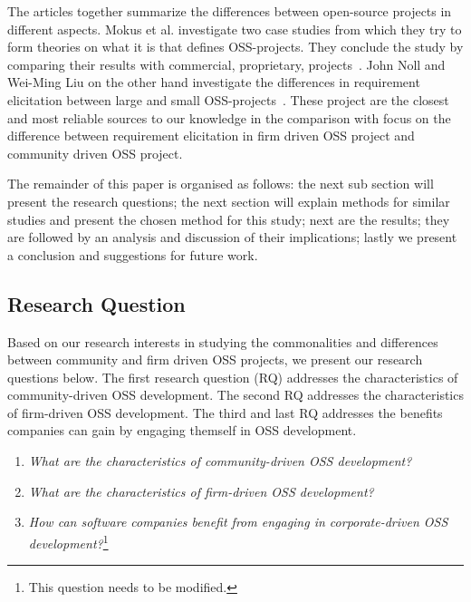 \documentclass[a4paper,11pt]{article}
\begin{document}
{%
The articles together summarize the differences between open-source projects in different aspects. Mokus et al. investigate two case studies from which they try to form theories on what it is that defines OSS-projects. They conclude the study by comparing their results with commercial, proprietary, projects~\cite{Mockus2002a}. John Noll and Wei-Ming Liu on the other hand investigate the differences in requirement elicitation between large and small OSS-projects~\cite{Noll}. These project are the closest and most reliable sources to our knowledge in the comparison with focus on the difference between requirement elicitation in firm driven OSS project and community driven OSS project.

The remainder of this paper is organised as follows: the next sub section will present the research questions; the next section will explain methods for similar studies and present the chosen method for this study; next are the results; they are followed by an analysis and discussion of their implications; lastly we present a conclusion and suggestions for future work.

\subsection{Research Question}
\label{sec:rq}
Based on our research interests in studying the commonalities and differences between community and firm driven OSS projects, we present our research questions below. The first research question (RQ) addresses the characteristics of community-driven OSS development. The second RQ addresses the characteristics of firm-driven OSS development. The third and last RQ addresses the benefits companies can gain by engaging themself in OSS development.
\begin{enumerate}[label=RQ\arabic*]
	\item \emph{What are the characteristics of community-driven OSS development?}
	\item \emph{What are the characteristics of firm-driven OSS development?}
	\item \emph{How can software companies benefit from engaging in corporate-driven OSS development?}\footnote{This question needs to be modified.}
\end{enumerate}
\newpage
}
\end{document}
